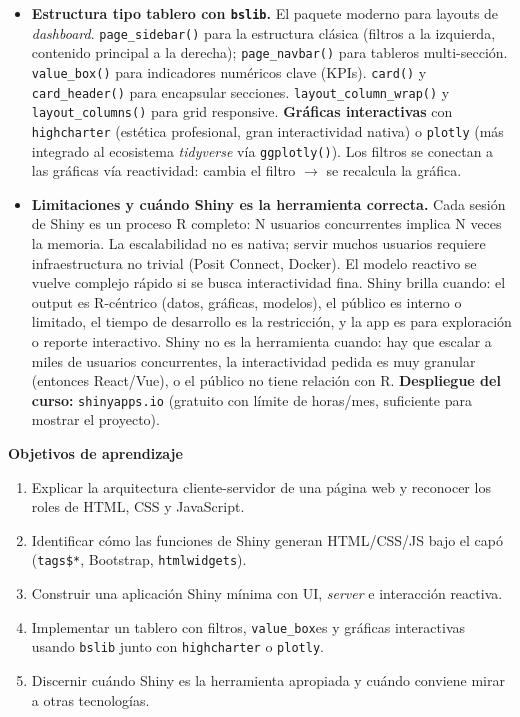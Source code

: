 \documentclass[11pt,letterpaper]{article}
\newcommand{\orange}[1]{{\color{redorange}#1}}
\begin{document}
\begin{itemize}[leftmargin=*, itemsep=2pt]
    \item \textbf{Estructura tipo tablero con \texttt{bslib}.} El paquete moderno para layouts de \textit{dashboard}. \texttt{page\_sidebar()} para la estructura clásica (filtros a la izquierda, contenido principal a la derecha); \texttt{page\_navbar()} para tableros multi-sección. \texttt{value\_box()} para indicadores numéricos clave (KPIs). \texttt{card()} y \texttt{card\_header()} para encapsular secciones. \texttt{layout\_column\_wrap()} y \texttt{layout\_columns()} para grid responsive. \textbf{Gráficas interactivas} con \texttt{highcharter} (estética profesional, gran interactividad nativa) o \texttt{plotly} (más integrado al ecosistema \textit{tidyverse} vía \texttt{ggplotly()}). Los filtros se conectan a las gráficas vía reactividad: cambia el filtro $\to$ se recalcula la gráfica.
    \item \textbf{Limitaciones y cuándo Shiny es la herramienta correcta.} Cada sesión de Shiny es un proceso R completo: N usuarios concurrentes implica N veces la memoria. La escalabilidad no es nativa; servir muchos usuarios requiere infraestructura no trivial (Posit Connect, Docker). El modelo reactivo se vuelve complejo rápido si se busca interactividad fina. \orange{Shiny brilla cuando}: el output es R-céntrico (datos, gráficas, modelos), el público es interno o limitado, el tiempo de desarrollo es la restricción, y la app es para exploración o reporte interactivo. \orange{Shiny no es la herramienta} cuando: hay que escalar a miles de usuarios concurrentes, la interactividad pedida es muy granular (entonces React/Vue), o el público no tiene relación con R. \textbf{Despliegue del curso:} \texttt{shinyapps.io} (gratuito con límite de horas/mes, suficiente para mostrar el proyecto).
\end{itemize}

\medskip
\noindent\textbf{Objetivos de aprendizaje}
\begin{enumerate}[leftmargin=*, itemsep=1pt]
    \item Explicar la arquitectura cliente-servidor de una página web y reconocer los roles de HTML, CSS y JavaScript.
    \item Identificar cómo las funciones de Shiny generan HTML/CSS/JS bajo el capó (\texttt{tags\$*}, Bootstrap, \texttt{htmlwidgets}).
    \item Construir una aplicación Shiny mínima con UI, \textit{server} e interacción reactiva.
    \item Implementar un tablero con filtros, \texttt{value\_box}es y gráficas interactivas usando \texttt{bslib} junto con \texttt{highcharter} o \texttt{plotly}.
    \item Discernir cuándo Shiny es la herramienta apropiada y cuándo conviene mirar a otras tecnologías.
\end{enumerate}
\end{document}
